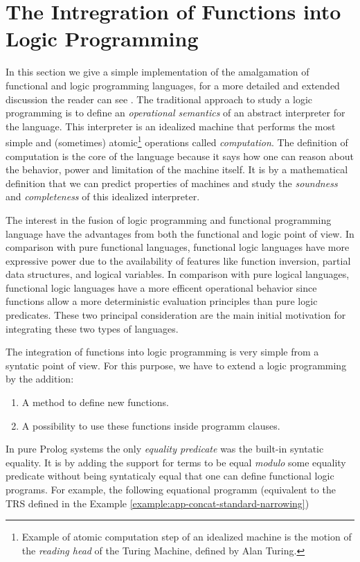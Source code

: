 \section{The Intregration of Functions into Logic Programming}
In this section we give a simple implementation of the amalgamation of functional and logic programming languages, for a more detailed and extended discussion the reader can see \cite{HANUS1994583}. The traditional approach to study a logic programming  is to define an \textit{operational semantics} of an abstract interpreter for the language. This interpreter is an idealized machine that performs the most simple and (sometimes) atomic\footnote{Example of atomic computation step of an idealized machine is the motion of the \textit{reading head} of the Turing Machine, defined by Alan Turing.} operations called \textit{computation}. The definition of computation is the core of the language because it says how one can reason about the behavior, power and limitation of the machine itself. It is by a mathematical definition that we can predict properties of machines and study the \textit{soundness} and \textit{completeness} of this idealized interpreter.

The interest in the fusion of logic programming and functional programming language have the advantages from both the functional and logic point of view. In comparison with pure functional languages, functional logic languages have more expressive power due to the availability of features like function inversion, partial data structures, and logical variables. In comparison with pure logical languages, functional logic languages have a more efficent operational behavior since functions allow a more deterministic evaluation principles than pure logic predicates. These two principal consideration are the main initial motivation for integrating these two types of languages.

The integration of functions into logic programming is very simple from a syntatic point of view. For this purpose, we have to extend a logic programming by the addition:
\begin{enumerate}
	\item A method to define new functions.
	\item A possibility to use these functions inside programm clauses.
\end{enumerate}

In pure Prolog systems the only \textit{equality predicate} was the built-in syntatic equality. It is by adding the support for terms to be equal \textit{modulo} some equality predicate without being syntaticaly equal that one can define functional logic programs. For example, the following equational programm (equivalent to the TRS defined in the Example \ref{example:app-concat-standard-narrowing})

